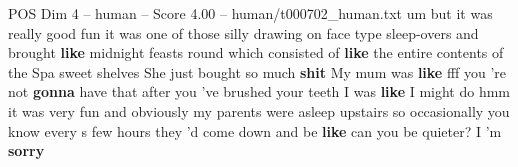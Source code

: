 \begin{textsample}{POS Dim 4 – human – Score 4.00 – human/t000702\_human.txt}  \label{ex:f4_pos_008}
um but it was really good fun it was one of those silly drawing on face type sleep-overs and brought \textbf{like} midnight feasts round which consisted of \textbf{like} the entire contents of the Spa sweet shelves She just bought so much \textbf{shit} My mum was \textbf{like} fff you 're not \textbf{gonna} have that after you 've brushed your teeth I was \textbf{like} I might do hmm it was very fun and obviously my parents were asleep upstairs so occasionally you know every s few hours they 'd come down and be \textbf{like} can you be quieter?
I 'm \textbf{sorry}

\end{textsample}
